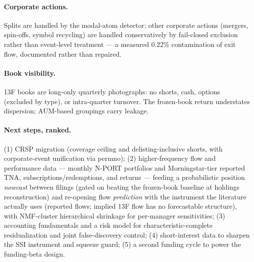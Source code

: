 \paragraph{Corporate actions.} Splits are handled by the modal-atom
detector; other corporate actions (mergers, spin-offs, symbol
recycling) are handled conservatively by fail-closed exclusion
rather than event-level treatment --- a measured 0.22\%
contamination of exit flow, documented rather than repaired.

\paragraph{Book visibility.} 13F books are long-only quarterly
photographs: no shorts, cash, options (excluded by type), or
intra-quarter turnover. The frozen-book return understates
dispersion; AUM-based groupings carry leakage.

\paragraph{Next steps, ranked.} (1) CRSP migration (coverage ceiling
and delisting-inclusive shorts, with corporate-event unification via
permno); (2) higher-frequency flow and performance data ---
monthly N-PORT portfolios and Morningstar-tier reported TNA,
subscriptions/redemptions, and returns --- feeding a probabilistic
position \emph{nowcast} between filings (gated on beating the
frozen-book baseline at holdings reconstruction) and re-opening flow
\emph{prediction} with the instrument the literature actually uses
(reported flows; implied 13F flow has no forecastable structure),
with NMF-cluster hierarchical shrinkage for per-manager
sensitivities; (3) accounting fundamentals and a risk model for
characteristic-complete residualization and joint false-discovery
control; (4) short-interest data to sharpen the SSI instrument and
squeeze guard; (5) a second funding cycle to power the funding-beta
design.
